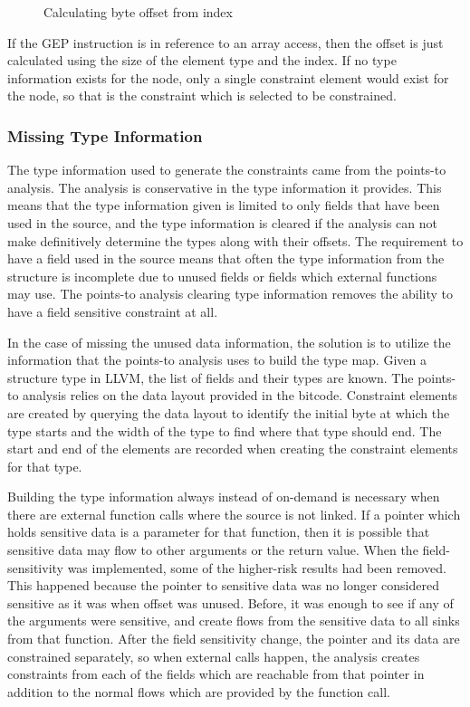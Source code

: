 \begin{figure}[h!]

\caption{Calculating byte offset from index}
\label{alg:findoffset}
\end{figure}

If the GEP instruction is in reference to an array access, then the offset is
just calculated using the size of the element type and the index. If no type
information exists for the node, only a single constraint element would exist
for the node, so that is the constraint which is selected to be constrained.

\subsubsection{Missing Type Information}

The type information used to generate the constraints came from the points-to
analysis. The analysis is conservative in the type information it
provides. This means that the type information given is limited to only fields
that have been used in the source, and the type information is cleared if the
analysis can not make definitively determine the types along with their offsets.
The requirement to have a field used in the source means that often the type
information from the structure is incomplete due to unused fields or fields
which external functions may use. The points-to analysis clearing type
information removes the ability to have a field sensitive constraint at all.

In the case of missing the unused data information, the solution is to utilize
the information that the points-to analysis uses to build the type map. Given a
structure type in LLVM, the list of fields and their types are known. The
points-to analysis relies on the data layout provided in the bitcode. Constraint
elements are created by querying the data layout to identify the initial byte at
which the type starts and the width of the type to find where that type should
end. The start and end of the elements are recorded when creating the constraint
elements for that type.

Building the type information always instead of on-demand is necessary when
there are external function calls where the source is not linked. If a pointer
which holds sensitive data is a parameter for that function, then it is possible
that sensitive data may flow to other arguments or the return value. When the
field-sensitivity was implemented, some of the higher-risk results had been
removed. This happened because the pointer to sensitive data was no longer
considered sensitive as it was when offset was unused. Before, it was enough to
see if any of the arguments were sensitive, and create flows from the sensitive
data to all sinks from that function. After the field sensitivity change, the
pointer and its data are constrained separately, so when external calls happen,
the analysis creates constraints from each of the fields which are reachable
from that pointer in addition to the normal flows which are provided by the
function call.

